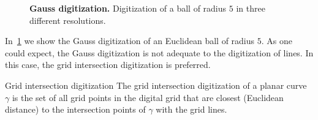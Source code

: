 \begin{figure}
{}
\caption{\textbf{Gauss digitization.} Digitization of a ball of radius $5$ in three different resolutions.}
\label{ch4:fig:gauss-digitization}
\end{figure}

In~\cref{ch4:fig:gauss-digitization} we show the Gauss digitization of an Euclidean ball of radius $5$. As one could expect, the Gauss digitization is not adequate to the digitization of lines. In this case, the grid intersection digitization is preferred.

\begin{definition}{Grid intersection digitization}
The grid intersection digitization of a planar curve $\gamma$ is the set of all grid points in the digital grid that are closest (Euclidean distance) to the intersection points of $\gamma$ with the grid lines.
\end{definition}

